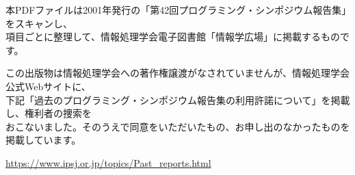 \documentclass[b5j]{jsarticle}
\begin{document}
\begin{flushleft}

本PDFファイルは2001年発行の「第42回プログラミング・シンポジウム報告集」をスキャンし、\\項目ごとに整理して、情報処理学会電子図書館「情報学広場」に掲載するものです。

\medskip

この出版物は情報処理学会への著作権譲渡がなされていませんが、情報処理学会公式Webサイトに、\\下記「過去のプログラミング・シンポジウム報告集の利用許諾について」を掲載し、権利者の捜索を\\おこないました。そのうえで同意をいただいたもの、お申し出のなかったものを掲載しています。

\medskip

\url{https://www.ipsj.or.jp/topics/Past_reports.html}

\end{flushleft}

\bigskip
\end{document}

